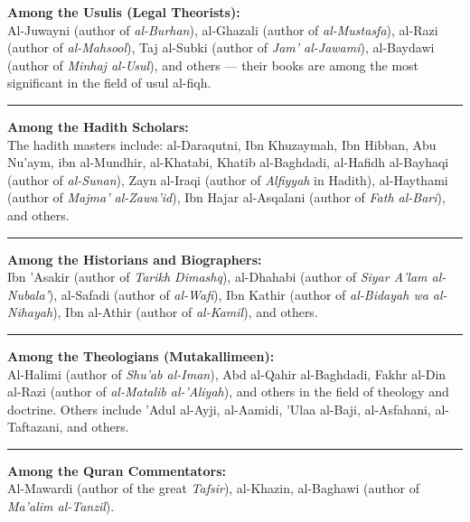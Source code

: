 \documentclass[
  a4paper,
  DIV=11,
  numbers=noendperiod]{scrartcl}
\begin{document}
\textbf{Among the Usulis (Legal Theorists):}\\
Al-Juwayni (author of \emph{al-Burhan}), al-Ghazali (author of
\emph{al-Mustasfa}), al-Razi (author of \emph{al-Mahsool}), Taj al-Subki
(author of \emph{Jam' al-Jawami}), al-Baydawi (author of \emph{Minhaj
al-Usul}), and others --- their books are among the most significant in
the field of usul al-fiqh.

\begin{center}\rule{0.5\linewidth}{0.5pt}\end{center}

\textbf{Among the Hadith Scholars:}\\
The hadith masters include: al-Daraqutni, Ibn Khuzaymah, Ibn Hibban, Abu
Nu'aym, ibn al-Mundhir, al-Khatabi, Khatib al-Baghdadi, al-Hafidh
al-Bayhaqi (author of \emph{al-Sunan}), Zayn al-Iraqi (author of
\emph{Alfiyyah} in Hadith), al-Haythami (author of \emph{Majma'
al-Zawa'id}), Ibn Hajar al-Asqalani (author of \emph{Fath al-Bari}), and
others.

\begin{center}\rule{0.5\linewidth}{0.5pt}\end{center}

\textbf{Among the Historians and Biographers:}\\
Ibn 'Asakir (author of \emph{Tarikh Dimashq}), al-Dhahabi (author of
\emph{Siyar A'lam al-Nubala'}), al-Safadi (author of \emph{al-Wafi}),
Ibn Kathir (author of \emph{al-Bidayah wa al-Nihayah}), Ibn al-Athir
(author of \emph{al-Kamil}), and others.

\begin{center}\rule{0.5\linewidth}{0.5pt}\end{center}

\textbf{Among the Theologians (Mutakallimeen):}\\
Al-Halimi (author of \emph{Shu'ab al-Iman}), Abd al-Qahir al-Baghdadi,
Fakhr al-Din al-Razi (author of \emph{al-Matalib al-'Aliyah}), and
others in the field of theology and doctrine. Others include 'Adul
al-Ayji, al-Aamidi, 'Ulaa al-Baji, al-Asfahani, al-Taftazani, and
others.

\begin{center}\rule{0.5\linewidth}{0.5pt}\end{center}

\textbf{Among the Quran Commentators:}\\
Al-Mawardi (author of the great \emph{Tafsir}), al-Khazin, al-Baghawi
(author of \emph{Ma'alim al-Tanzil}).
\end{document}
